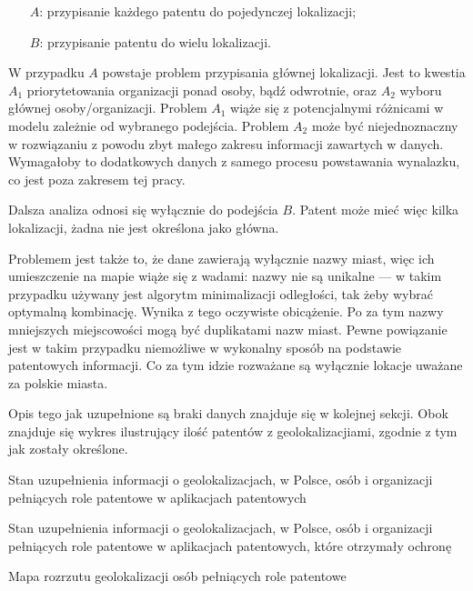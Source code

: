 \begin{enumerate}
\item[$A$:] przypisanie każdego patentu do pojedynczej lokalizacji;
\item[$B$:] przypisanie patentu do wielu lokalizacji.
\end{enumerate}

W przypadku $A$ powstaje problem przypisania głównej lokalizacji.
Jest to kwestia $A_1$ priorytetowania organizacji ponad osoby, bądź
odwrotnie, oraz $A_2$ wyboru głównej osoby/organizacji.
Problem $A_1$ wiąże się z potencjalnymi różnicami w modelu zależnie
od wybranego podejścia. Problem $A_2$ może być niejednoznaczny
w rozwiązaniu z powodu zbyt małego zakresu informacji zawartych w danych.
Wymagałoby to dodatkowych danych z samego procesu powstawania wynalazku,
co jest poza zakresem tej pracy.

Dalsza analiza odnosi się wyłącznie do podejścia $B$.
Patent może mieć więc kilka lokalizacji, żadna nie jest określona jako główna.

Problemem jest także to, że dane zawierają wyłącznie nazwy miast, 
więc ich umieszczenie na mapie wiąże się z wadami: 
nazwy nie są unikalne --- w takim przypadku używany jest algorytm minimalizacji 
odległości, tak żeby wybrać optymalną kombinację. 
Wynika z tego oczywiste obicążenie. 
Po za tym nazwy mniejszych miejscowości mogą być duplikatami
nazw miast. Pewne powiązanie jest w takim przypadku niemożliwe
w wykonalny sposób na podstawie patentowych informacji.
Co za tym idzie rozważane są wyłącznie lokacje uważane za polskie miasta.


\newpage

Opis tego jak uzupełnione są braki danych znajduje się w kolejnej sekcji.
Obok znajduje się wykres ilustrujący ilość patentów z geolokalizacjiami,
zgodnie z tym jak zostały określone.

{ Stan uzupełnienia informacji o geolokalizacjach, w Polsce, 
  osób i organizacji  pełniących role patentowe
  w aplikacjach patentowych}

{ Stan uzupełnienia informacji o geolokalizacjach, w Polsce, 
  osób i organizacji  pełniących role patentowe
  w aplikacjach patentowych, które otrzymały ochronę}

\newpage

{Mapa rozrzutu geolokalizacji osób pełniących role patentowe}

